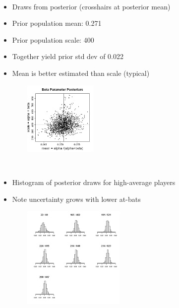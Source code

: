 \documentclass[10pt]{report}
\begin{document}
\\[8pt]
\begin{minipage}[t]{0.55\textwidth}
\begin{itemize}
\item Draws from posterior (crosshairs at posterior mean)
\item Prior population mean:   0.271
\item Prior population scale:  400
\item Together yield prior std dev of 0.022
\item Mean is better estimated than scale (typical)
\end{itemize}
\end{minipage}
\begin{minipage}[t]{0.45\textwidth}
\vfill
\mbox{ } \ \ \ \ \ \ \includegraphics[height=1.4in]{img/baseball-beta-posterior-scatter.png}
\vfill
\end{minipage}

\\[8pt]
\begin{minipage}[t]{0.45\textwidth}
\begin{itemize}
\item Histogram of posterior draws for high-average players
\item Note uncertainty grows with lower at-bats
\\
\end{itemize}
\end{minipage}
\begin{minipage}[t]{0.55\textwidth}
\vfill
\mbox{ } \ \ \ \ \ \ 
\includegraphics[height=1.95in]{img/batting-ability-posteriors.png}
\vfill
\end{minipage}
\end{document}
